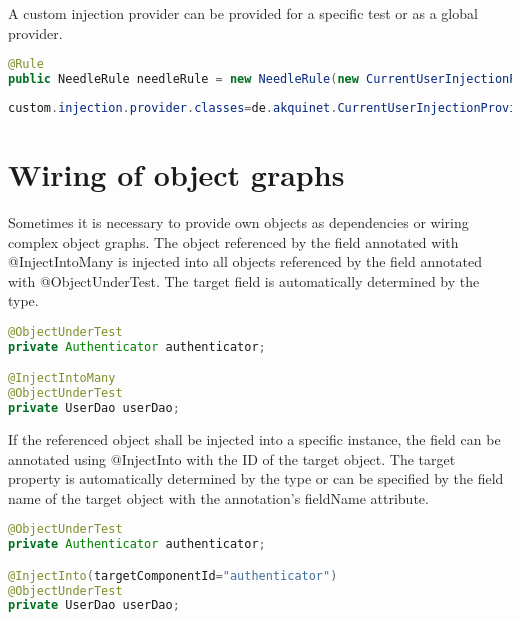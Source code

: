 A custom injection provider can be provided for a specific test or as a global provider.

\begin{lstlisting}[language={JAVA},caption=Custom injection provider for a specific test]
@Rule
public NeedleRule needleRule = new NeedleRule(new CurrentUserInjectionProvider());
\end{lstlisting}


\begin{lstlisting}[language={JAVA},caption=Global custom injection provider]
custom.injection.provider.classes=de.akquinet.CurrentUserInjectionProvider
\end{lstlisting}


\section{Wiring of object graphs}
\label{sec:Wiring of object graphs}

Sometimes it is necessary to provide own objects as dependencies or wiring complex object graphs.
The object referenced by the field annotated with @InjectIntoMany is injected into all objects referenced by the field annotated with @ObjectUnderTest.
The target field is automatically determined by the type.

\begin{lstlisting}[language={JAVA},caption=InjectIntoMany]
@ObjectUnderTest
private Authenticator authenticator;

@InjectIntoMany
@ObjectUnderTest
private UserDao userDao;
\end{lstlisting}

If the referenced object shall be injected into a specific instance, the field can be annotated using @InjectInto with the ID of the target object.
The target property is automatically determined by the type or can be specified by the field name of the target object with the annotation's fieldName attribute.

\begin{lstlisting}[language={JAVA},caption=InjectInto]
@ObjectUnderTest
private Authenticator authenticator;

@InjectInto(targetComponentId="authenticator")
@ObjectUnderTest
private UserDao userDao;
\end{lstlisting}





